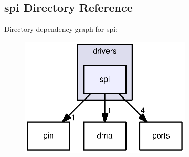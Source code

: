 \subsection{spi Directory Reference}
\label{dir_06c335b5d26ee58949e52d1dc1675348}
Directory dependency graph for spi\+:
\nopagebreak
\begin{figure}[H]
\begin{center}
\leavevmode
\includegraphics[width=235pt]{dir_06c335b5d26ee58949e52d1dc1675348_dep}
\end{center}
\end{figure}
